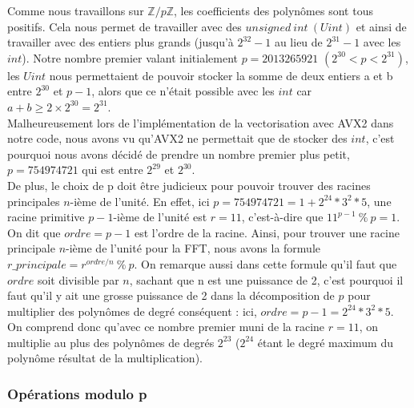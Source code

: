 \documentclass[12pt, a4paper]{article}
\begin{document}
Comme nous travaillons sur $\mathbb{Z}/p\mathbb{Z}$, les coefficients des polynômes sont tous positifs. Cela nous permet de travailler avec des $unsigned\ int\ (Uint)$ et ainsi de travailler avec des entiers plus grands (jusqu’à $2^{32}-1$ au lieu de $2^{31}-1$ avec les $int$). Notre nombre premier valant initialement $p=2013265921$ $(2^{30} < p < 2^{31})$, les $Uint$ nous permettaient de pouvoir stocker la somme de deux entiers a et b entre $2^{30}$ et $p-1$, alors que ce n'était possible avec les $int$ car $a+b\geq2\times2^{30}=2^{31}$. \\
\indent Malheureusement lors de l'implémentation de la vectorisation avec AVX2 dans notre code, nous avons vu qu'AVX2 ne permettait que de stocker des $int$, c'est pourquoi nous avons décidé de prendre un nombre premier plus petit, $p=754974721$ qui est entre $2^{29}$ et  $2^{30}$. \\
\indent De plus, le choix de p doit être judicieux pour pouvoir trouver des racines principales $n$-ième de l'unité. En effet, ici $p = 754974721 = 1+2^{24}*3^2*5$, une racine primitive $p-1$-ième de l'unité est $r = 11$, c'est-à-dire que $11^{p-1}\ \%\ p = 1$. On dit que $ordre = p-1$ est l'ordre de la racine. Ainsi, pour trouver une racine principale $n$-ième de l'unité pour la FFT, nous avons la formule $r\_principale = r^{ordre/n}\ \% \ p$. On remarque aussi dans cette formule qu'il faut que $ordre$ soit divisible par $n$, sachant que n est une puissance de 2, c'est pourquoi il faut qu'il y ait une grosse puissance de 2 dans la décomposition de $p$ pour multiplier des polynômes de degré conséquent : ici, $ordre = p-1 = 2^{24}*3^2*5$. On comprend donc qu'avec ce nombre premier muni de la racine $r = 11$, on multiplie au plus des polynômes de degrés $2^{23}$ ($2^{24}$ étant le degré maximum du polynôme résultat de la multiplication).

\subsubsection{Opérations modulo p}
\end{document}
